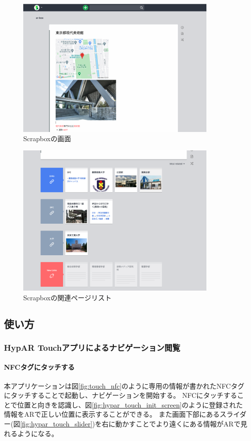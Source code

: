 \begin{figure}[h]
  \centering
  \includegraphics[width=100mm]{images/scrapbox_screen.png}
  \caption{Scrapboxの画面} \label{fig:scrapbox}
\end{figure}

\begin{figure}[h]
  \centering
  \includegraphics[width=100mm]{images/scrapbox_related_screen.png}
  \caption{Scrapboxの関連ページリスト} \label{fig:scrapbox_related}
\end{figure}

\subsection{使い方}

\subsubsection{HypAR Touchアプリによるナビゲーション閲覧}
\paragraph*{NFCタグにタッチする}
本アプリケーションは図\ref{fig:touch_nfc}のように専用の情報が書かれたNFCタグにタッチすることで起動し、ナビゲーションを開始する。
NFCにタッチすることで位置と向きを認識し、図\ref{fig:hypar_touch_init_screen}のように登録された情報をARで正しい位置に表示することができる。
また画面下部にあるスライダー(図\ref{fig:hypar_touch_slider})を右に動かすことでより遠くにある情報がARで見れるようになる。

